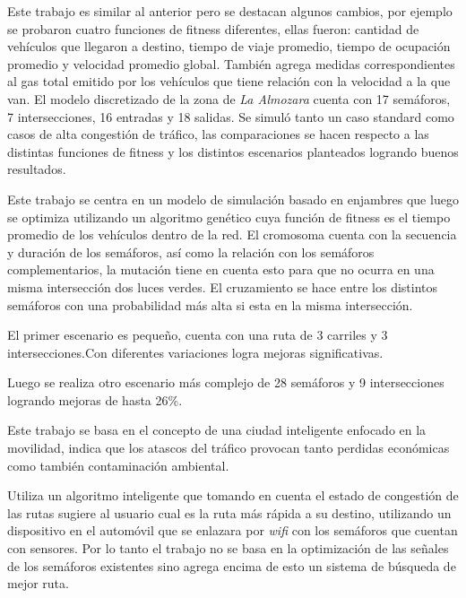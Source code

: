 \begin{itemize}
	\begin{item}
		Este trabajo es similar al anterior pero se destacan algunos cambios, por ejemplo se probaron cuatro funciones de fitness diferentes, ellas fueron: cantidad de vehículos que llegaron a destino, tiempo de viaje promedio, tiempo de ocupación promedio y velocidad promedio global.
		También agrega medidas correspondientes al gas total emitido por los vehículos que tiene relación con la velocidad a la que van.
		El modelo discretizado de la zona de \emph{La Almozara} cuenta con 17 semáforos, 7 intersecciones, 16 entradas y 18 salidas.
		Se simuló tanto un caso standard como casos de alta congestión de tráfico, las comparaciones se hacen respecto a las distintas funciones de fitness y los distintos escenarios planteados logrando buenos resultados.
		
	\end{item}
	
	
	\begin{item}
		\bibentry{Penner2002}
		Este trabajo se centra en un modelo de simulación basado en enjambres que luego se optimiza utilizando un algoritmo genético cuya función de fitness es el tiempo promedio de los vehículos dentro de la red. El cromosoma cuenta con la secuencia y duración de los semáforos, así como la relación con los semáforos complementarios, la mutación tiene en cuenta esto para que no ocurra en una misma intersección dos luces verdes. El cruzamiento se hace entre los distintos semáforos con una probabilidad más alta si esta en la misma intersección.
		
		El primer escenario es pequeño, cuenta con una ruta de 3 carriles y 3 intersecciones.Con diferentes variaciones logra mejoras significativas.
		
		Luego se realiza otro escenario más complejo de 28 semáforos y 9 intersecciones logrando mejoras de hasta 26\%.
	\end{item}	
	
	
	\begin{item}
		\bibentry{Stolfi2012}
		Este trabajo se basa en el concepto de una ciudad inteligente enfocado en la movilidad, indica que los atascos del tráfico provocan tanto perdidas económicas como también contaminación ambiental.
		
		Utiliza un algoritmo inteligente que tomando en cuenta el estado de congestión de las rutas sugiere al usuario cual es la ruta más rápida a su destino, utilizando un dispositivo en el automóvil que se enlazara por \emph{wifi} con los semáforos que cuentan con sensores. Por lo tanto el trabajo no se basa en la optimización de las señales de los semáforos existentes sino agrega encima de esto un sistema de búsqueda de mejor ruta.
		

\end{item}
\end{itemize}
